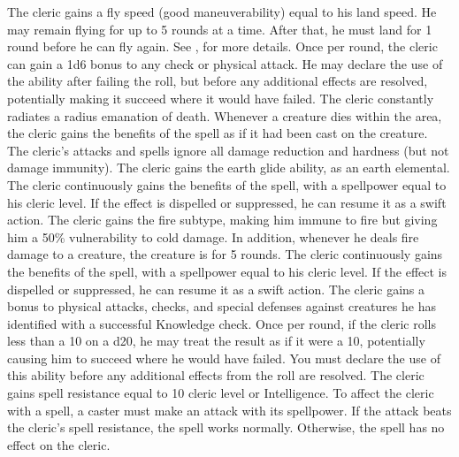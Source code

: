The cleric gains a fly speed (good maneuverability) equal to his land speed.
He may remain flying for up to 5 rounds at a time.
After that, he must land for 1 round before he can fly again.
See , for more details.
Once per round, the cleric can gain a \plus1d6 bonus to any check or physical attack.
He may declare the use of the ability after failing the roll, but before any additional effects are resolved, potentially making it succeed where it would have failed.
The cleric constantly radiates a \areamed radius emanation of death.
Whenever a creature dies within the area, the cleric gains the benefits of the  spell as if it had been cast on the creature.
The cleric's attacks and spells ignore all damage reduction and hardness (but not damage immunity).
The cleric gains the earth glide ability, as an earth elemental.
 The cleric continuously gains the benefits of the 
spell, with a spellpower equal to his cleric level.
If the effect is dispelled or suppressed, he can resume it as a swift action.
The cleric gains the fire subtype, making him immune to fire but giving him a 50\% vulnerability to cold damage.
In addition, whenever he deals fire damage to a creature, the creature is \ignited for 5 rounds.
 The cleric continuously gains the benefits of the 
spell, with a spellpower equal to his cleric level.
If the effect is dispelled or suppressed, he can resume it as a swift action.
The cleric gains a  bonus to physical attacks, checks, and special defenses against creatures he has identified with a successful Knowledge check.
Once per round, if the cleric rolls less than a 10 on a d20, he may treat the result as if it were a 10, potentially causing him to succeed where he would have failed.
You must declare the use of this ability before any additional effects from the roll are resolved.
The cleric gains spell resistance equal to 10 \add cleric level or Intelligence.
To affect the cleric with a spell, a caster must make an attack with its spellpower.
If the attack beats the cleric's spell resistance, the spell works normally.
Otherwise, the spell has no effect on the cleric.

